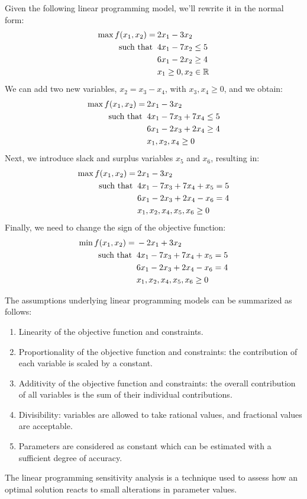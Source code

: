 \begin{example}
    Given the following linear programming model, we'll rewrite it in the normal form:
    \begin{align*}
        \max{f(x_1,x_2)}           =&\: 2x_1-3x_2          \\
        \textnormal{such that }     &\: 4x_1-7x_2 \leq 5  \\
                                    &\: 6x_1-2x_2 \geq 4  \\
                                    &\: x_1 \geq 0, x_2 \in \mathbb{R}
    \end{align*}
    We can add two new variables, $x_2=x_3-x_4$, with $x_3,x_4 \geq 0$, and we obtain:
    \begin{align*}
        \max{f(x_1,x_2)}           =&\: 2x_1-3x_2          \\
        \textnormal{such that }     &\: 4x_1-7x_3+7x_4 \leq 5  \\
                                    &\: 6x_1-2x_3+2x_4 \geq 4  \\
                                    &\: x_1,x_2,x_4 \geq 0
    \end{align*}
    Next, we introduce slack and surplus variables $x_5$ and $x_6$, resulting in:
    \begin{align*}
        \max{f(x_1,x_2)}           =&\: 2x_1-3x_2          \\
        \textnormal{such that }     &\: 4x_1-7x_3+7x_4+x_5 = 5  \\
                                    &\: 6x_1-2x_3+2x_4-x_6 = 4  \\
                                    &\: x_1,x_2,x_4,x_5,x_6 \geq 0
    \end{align*}
    Finally, we need to change the sign of the objective function:
    \begin{align*}
        \min{f(x_1,x_2)}           =&\: -2x_1+3x_2          \\
        \textnormal{such that }     &\: 4x_1-7x_3+7x_4+x_5 = 5  \\
                                    &\: 6x_1-2x_3+2x_4-x_6 = 4  \\
                                    &\: x_1,x_2,x_4,x_5,x_6 \geq 0
    \end{align*}
\end{example}
The assumptions underlying linear programming models can be summarized as follows:
\begin{enumerate}
    \item Linearity of the objective function and constraints. 
    \item Proportionality of the objective function and constraints: the contribution of each variable is scaled by a constant. 
    \item Additivity of the objective function and constraints: the overall contribution of all variables is the sum of their individual contributions.
    \item Divisibility: variables are allowed to take rational values, and fractional values are acceptable.
    \item Parameters are considered as constant which can be estimated with a sufficient degree of accuracy. 
\end{enumerate}
The linear programming sensitivity analysis is a technique used to assess how an optimal solution reacts to small alterations in parameter values.